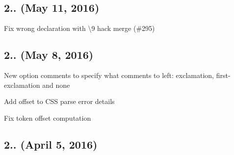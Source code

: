 \subsection*{2.. (May 11, 2016)}


\begin{DoxyItemize}
\item Fix wrong declaration with {\ttfamily \textbackslash{}9} hack merge (\#295)
\end{DoxyItemize}

\subsection*{2.. (May 8, 2016)}


\begin{DoxyItemize}
\item New option {\ttfamily comments} to specify what comments to left\+: {\ttfamily exclamation}, {\ttfamily first-\/exclamation} and {\ttfamily none}
\item Add {\ttfamily offset} to C\+SS parse error details
\item Fix token {\ttfamily offset} computation
\end{DoxyItemize}

\subsection*{2.. (April 5, 2016)}


